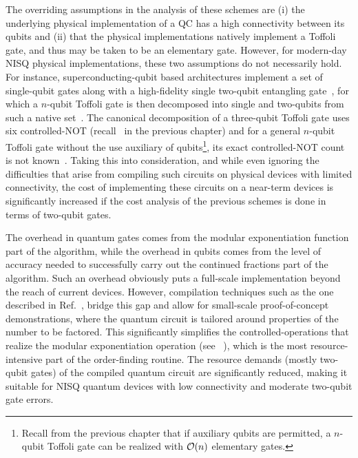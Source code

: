 \bigskip
\noindent
The overriding assumptions in the analysis of these schemes are (i) the underlying physical implementation of a QC has a high connectivity between its qubits and (ii) that the physical implementations natively implement a Toffoli gate, and thus may be taken to be an elementary gate. However, for modern-day \acs{NISQ} physical implementations, these two assumptions do not necessarily hold. For instance, superconducting-qubit based architectures implement a set of single-qubit gates along with a high-fidelity single two-qubit entangling gate~\cite{Kjaergaard_2020}, for which a $n$-qubit Toffoli gate is then decomposed into single and two-qubits from such a native set~\cite{Barenco_1995}. The canonical decomposition of a three-qubit Toffoli gate uses six controlled-NOT (recall~ in the previous chapter) and for a general $n$-qubit Toffoli gate without the use auxiliary of qubits\footnote{Recall from the previous chapter that if auxiliary qubits are permitted, a $n$-qubit Toffoli gate can be realized with $\mathcal{O}(n)$ elementary gates.}, its exact controlled-NOT count is not known~\cite{Shende_2008,Yu_2013}. Taking this into consideration, and while even ignoring the difficulties that arise from compiling such circuits on physical devices with limited connectivity, the cost of implementing these circuits on a near-term devices is significantly increased if the cost analysis of the previous schemes is done in terms of two-qubit gates.


\bigskip
\noindent
The overhead in quantum gates comes from the modular exponentiation function part of the algorithm, while the overhead in qubits comes from the level of accuracy needed to successfully carry out the continued fractions part of the algorithm. Such an overhead obviously puts a full-scale implementation beyond the reach of current devices. However, compilation techniques such as the one described in Ref.~\cite{Beckman_1996}, bridge this gap and allow for small-scale proof-of-concept demonstrations, where the quantum circuit is tailored around properties of the number to be factored. This significantly simplifies the controlled-operations that realize the modular exponentiation operation (see ~), which is the most resource-intensive part of the order-finding routine. The resource demands (mostly two-qubit gates) of the compiled quantum circuit are significantly reduced, making it suitable for NISQ quantum devices with low connectivity and moderate two-qubit gate errors.

